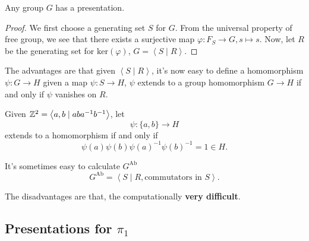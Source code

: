 \begin{theorem}
	Any group \(G\) has a presentation.
\end{theorem}
\begin{proof}
	We first choose a generating set \(S\) for \(G\). From the universal property of free group, we see that there exists a surjective map
	\(\varphi \colon F_S \to G, s \mapsto s\). Now, let \(R\) be the generating set for \(\mathrm{ker}(\varphi) \), \(G = \left< S \mid R \right> \).
\end{proof}

\begin{remark}
	The advantages are that given \(\left< S \mid R \right> \), it's now easy to define a homomorphism \(\psi \colon G\to H\) given a map
	\(\psi \colon S\to H\), \(\psi \) extends to a group homomorphism \(G\to H\) if and only if \(\psi \) vanishes on \(R\).
	\begin{eg}
		Given \(\mathbb{\MakeUppercase{z}} ^2 = \left< a, b \mid aba^{-1} b^{-1}  \right> \), let
		\[
			\psi \colon \{a, b\}\to H
		\]
		extends to a homomorphism if and only if
		\[
			\psi (a)\psi (b)\psi (a)^{-1} \psi (b)^{-1} = 1\in H.
		\]
	\end{eg}

	\par It's sometimes easy to calculate \(G^{\mathrm{Ab}}\)
	\[
		G^{\mathrm{Ab}} = \left< S \mid R, \text{commutators in \(S\)}\right>.
	\]

	\par The disadvantages are that, the computationally \textbf{very difficult}.
\end{remark}

\subsection{Presentations for \(\pi _1\)}
